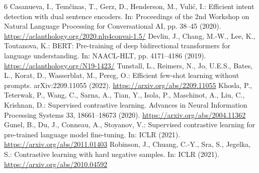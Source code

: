 \begin{thebibliography}{6}
 Casanueva, I., Tem\v{c}inas, T., Gerz, D., Henderson, M., Vuli\'c, I.: Efficient intent detection with dual sentence encoders. In: Proceedings of the 2nd Workshop on Natural Language Processing for Conversational AI, pp. 38--45 (2020). \url{https://aclanthology.org/2020.nlp4convai-1.5/}
 Devlin, J., Chang, M.-W., Lee, K., Toutanova, K.: BERT: Pre-training of deep bidirectional transformers for language understanding. In: NAACL-HLT, pp. 4171--4186 (2019). \url{https://aclanthology.org/N19-1423/}
 Tunstall, L., Reimers, N., Jo, U.E.S., Bates, L., Korat, D., Wasserblat, M., Pereg, O.: Efficient few-shot learning without prompts. arXiv:2209.11055 (2022). \url{https://arxiv.org/abs/2209.11055}
 Khosla, P., Teterwak, P., Wang, C., Sarna, A., Tian, Y., Isola, P., Maschinot, A., Liu, C., Krishnan, D.: Supervised contrastive learning. Advances in Neural Information Processing Systems 33, 18661--18673 (2020). \url{https://arxiv.org/abs/2004.11362}
 Gunel, B., Du, J., Conneau, A., Stoyanov, V.: Supervised contrastive learning for pre-trained language model fine-tuning. In: ICLR (2021). \url{https://arxiv.org/abs/2011.01403}
 Robinson, J., Chuang, C.-Y., Sra, S., Jegelka, S.: Contrastive learning with hard negative samples. In: ICLR (2021). \url{https://arxiv.org/abs/2010.04592}
\end{thebibliography}
